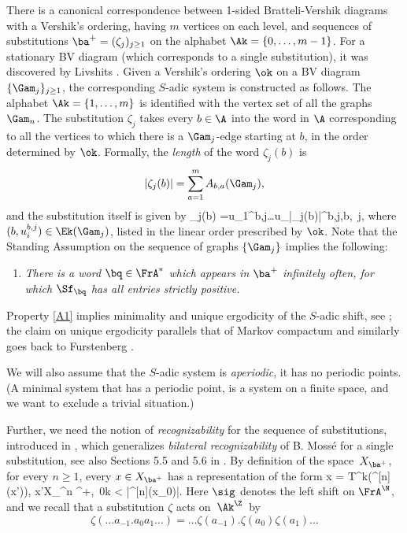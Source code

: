 There is a canonical correspondence between 1-sided Bratteli-Vershik diagrams with a Vershik's ordering, having $m$ vertices on each level, and sequences of substitutions $\ba^+=(\zeta_j)_{j\ge 1}$ on the alphabet
$\Ak = \{0,\ldots,m-1\}$. For a stationary BV diagram (which corresponds to a single substitution), it was discovered by Livshits \cite{Liv1}.
Given a Vershik's ordering $\ok$ on a BV diagram
$\{\Gam_{j}\}_{j\ge 1}$, the corresponding $S$-adic system is constructed as follows. The
alphabet $\Ak = \{1,\ldots,m\}$ is identified with the vertex set of all the graphs $\Gam_n$.
The substitution $\zeta_j$ takes every $b\in \A$ into the word in $\A$ corresponding to all the vertices to which
there is a $\Gam_{j}$-edge starting at $b$, in the order determined by $\ok$. Formally, the \emph{length} of the word $\zeta_j(b)$ is
\[
|\zeta_j(b)| = \sum_{a=1}^m A_{b,a}(\Gam_j),
\]
and the substitution itself is given by
\be \label{def-subs1}
\zeta_j(b) =u_1^{b,j}\dots u_{|\zeta_j(b)|}^{b,j},\quad b\in \A,\ j,
\ee
where $(b, u_i^{b,j})\in \Ek(\Gam_j)$, listed in the linear order prescribed by $\ok$. Note that the Standing Assumption on the sequence of graphs $\{\Gam_j\}$ implies the following:
\begin{enumerate}\renewcommand{\theenumi}{A\arabic{enumi}}
\item\label{A1}
\emph{There is a word $\bq\in \FrA^*$ which appears in $\ba^+$ infinitely often, for which $\Sf_\bq$ has all entries strictly positive.}
\end{enumerate}

Property \eqref{A1} implies minimality and unique ergodicity of the $S$-adic shift, see \hbox{\cite[Th.\,5.2 \& 5.7]{BD}}; the claim on unique ergodicity parallels that of Markov compactum and similarly goes back to Furstenberg \cite[(16.13)]{furst}.

We will also assume that the $S$-adic system is \emph{aperiodic}, \ie it has no periodic points. (A minimal system that has a periodic point, is a system on a finite space, and we want to exclude a trivial situation.)

Further, we need the notion of \emph{recognizability} for the sequence of substitutions, introduced
in \cite{BSTY}, which generalizes \emph{bilateral recognizability} of B. Mossé \cite{Mosse} for a single substitution, see also Sections 5.5 and 5.6 in \cite{Queff}. By definition of the space~$X_{\ba^+}$, for every $n\ge 1$, every $x\in X_{\ba^+}$ has a representation of the form
\be \label{recog}
x = T^k\bigl(\zeta^{[n]}(x')\bigr),\quad {} x'\in X_{\sig^n \ba^+},\ 0\le k < |\zeta^{[n]}(x_0)|.
\ee
Here $\sig$ denotes the left shift on $\FrA^\N$, and we recall that a substitution $\zeta$ acts on~$\Ak^\Z$~by
\[
\zeta(\ldots a_{-1}.a_0 a_1\ldots) = \ldots \zeta(a_{-1}).\zeta(a_0)\zeta(a_1)\ldots
\]

